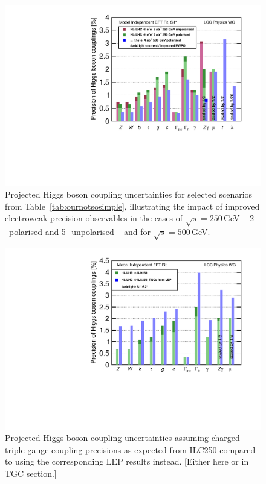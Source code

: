\begin{figure}
\begin{center}
\includegraphics[width=0.7\hsize]{chapters/figures/DeltaHXX_SM_ILC_EWPO_MI.pdf}
\caption{Projected Higgs boson coupling uncertainties for selected scenarios from Table~\ref{tab:ournotsosimple}, illustrating the impact of improved electroweak precision observables in the cases of $\sqrt{s}=250$\,GeV -- 2\,\iab\ polarised and 5\,\iab\ unpolarised -- and for $\sqrt{s}=500$\,GeV.}
\label{fig:ournotsosimple}
\end{center}
\end{figure}

\begin{figure}
\begin{center}
\includegraphics[width=0.7\hsize]{chapters/figures/DeltaHXX_SM_ILC_TGC_MI.pdf}
\caption{Projected Higgs boson coupling uncertainties assuming charged triple gauge coupling precisions as expected from ILC250 compared to using the corresponding LEP results instead. {\color{red}[Either here or in TGC section.]}}
\label{fig:oursimple}
\end{center}
\end{figure}



